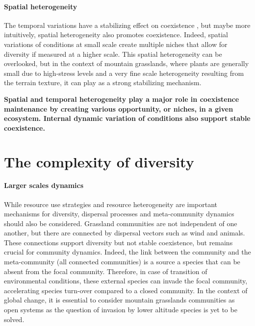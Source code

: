  
\paragraph{Spatial heterogeneity}

The temporal variations have a stabilizing effect on coexistence \cite{tilman_plant_1984}, but maybe more intuitively, spatial heterogeneity also promotes coexistence. Indeed, spatial variations of conditions at small scale create multiple niches that allow for diversity if measured at a higher scale. This spatial heterogeneity can be overlooked, but in the context of mountain grasslands, where plants are generally small due to high-stress levels and a very fine scale heterogeneity resulting from the terrain texture, it can play as a strong stabilizing mechanism.

%

\textbf{Spatial and temporal heterogeneity play a major role in coexistence maintenance by creating various opportunity, or niches, in a given ecosystem. Internal dynamic variation of conditions also support stable coexistence.}

\section{The complexity of diversity}

\paragraph{Larger scales dynamics}

While resource use strategies and resource heterogeneity are important mechanisms for diversity, dispersal processes and meta-community dynamics should also be considered. Grassland communities are not independent of one another, but there are connected by dispersal vectors such as wind and animals. These connections support diversity but not stable coexistence, but remains crucial for community dynamics. Indeed, the link between the community and the meta-community (all connected communities) is a source a species that can be absent from the focal community. Therefore, in case of transition of environmental conditions, these external species can invade the focal community, accelerating species turn-over compared to a closed community. In the context of global change, it is essential to consider mountain grasslands communities as open systems as the question of invasion by lower altitude species is yet to be solved.

